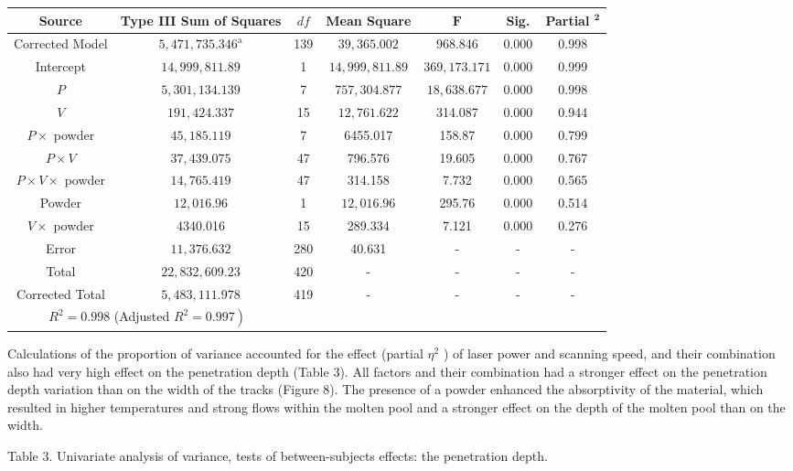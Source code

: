 \documentclass[10pt]{article}
\begin{document}
\begin{center}
\begin{tabular}{ccccccc}
\hline
Source & Type III Sum of Squares & $d f$ & Mean Square & $\boldsymbol{F}$ & Sig. & Partial $^{\mathbf{2}}$ \\
\hline
Corrected Model & $5,471,735.346^{\mathrm{a}}$ & 139 & $39,365.002$ & 968.846 & 0.000 & 0.998 \\
Intercept & $14,999,811.89$ & 1 & $14,999,811.89$ & $369,173.171$ & 0.000 & 0.999 \\
$P$ & $5,301,134.139$ & 7 & $757,304.877$ & $18,638.677$ & 0.000 & 0.998 \\
$V$ & $191,424.337$ & 15 & $12,761.622$ & 314.087 & 0.000 & 0.944 \\
$P \times$ powder & $45,185.119$ & 7 & 6455.017 & 158.87 & 0.000 & 0.799 \\
$P \times V$ & $37,439.075$ & 47 & 796.576 & 19.605 & 0.000 & 0.767 \\
$P \times V \times$ powder & $14,765.419$ & 47 & 314.158 & 7.732 & 0.000 & 0.565 \\
Powder & $12,016.96$ & 1 & $12,016.96$ & 295.76 & 0.000 & 0.514 \\
$V \times$ powder & 4340.016 & 15 & 289.334 & 7.121 & 0.000 & 0.276 \\
Error & $11,376.632$ & 280 & 40.631 & - & - & - \\
Total & $22,832,609.23$ & 420 & - & - & - & - \\
Corrected Total & $5,483,111.978$ & 419 & - & - & - & - \\
\hline
\multicolumn{2}{c}{$R^{2}=0.998$ (Adjusted $\left.R^{2}=0.997\right)$} &  &  &  &  &  \\
\hline
\end{tabular}
\end{center}

Calculations of the proportion of variance accounted for the effect (partial $\eta^{2}$ ) of laser power and scanning speed, and their combination also had very high effect on the penetration depth (Table 3). All factors and their combination had a stronger effect on the penetration depth variation than on the width of the tracks (Figure 8). The presence of a powder enhanced the absorptivity of the material, which resulted in higher temperatures and strong flows within the molten pool and a stronger effect on the depth of the molten pool than on the width.

Table 3. Univariate analysis of variance, tests of between-subjects effects: the penetration depth.
\end{document}
